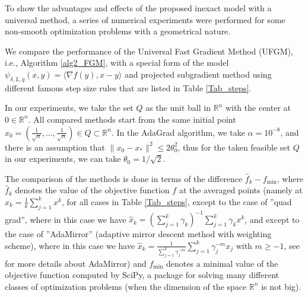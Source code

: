 \documentclass[11pt]{amsart}
\theoremstyle{definition}
\numberwithin{equation}{section}
\begin{document}
To show the advantages and effects of the proposed inexact model with a universal method, a series of numerical experiments were performed for some non-smooth optimization problems with a geometrical nature. 

We compare the performance of the Universal Fast Gradient Method (UFGM), i.e., Algorithm \ref{alg2_FGM}, with a special form of the model $\psi_{\delta, L, q}(x,y) = \langle \nabla f(y), x - y \rangle$ and projected subgradient method using different famous step size rules that are listed in Table \ref{Tab_steps}. 

In our experiments, we take the set $Q$ as the unit ball in $\mathbb{R}^n$ with the center at $0 \in \mathbb{R}^n$. All compared methods start from the same initial point $x_0 = \left(\frac{1}{\sqrt{n}}, \ldots, \frac{1}{\sqrt{n}}\right) \in Q \subset \mathbb{R}^n$. In the AdaGrad algorithm, we take $\alpha = 10^{-8}$, and there is an assumption that $\|x_0 - x_*\|^2 \leq 2 \theta_0^2$, thus for the taken feasible set $Q$ in our experiments, we can take $\theta_0 = 1/\sqrt{2}$.  

The comparison of the methods is done in terms of the difference $\hat{f}_k - f_{\text{min}}$, where $\hat{f}_k$ denotes the value of the objective function $f$ at the averaged points (namely at $\hat{x}_k = \frac{1}{k} \sum_{j = 1}^{k} x^k$, for all cases in Table \ref{Tab_steps}, except to the case of ''quad grad'', where in this case we have $\hat{x}_k = \left(\sum_{j = 1}^{k} \gamma_k\right)^{-1} \sum_{j=1}^{k} \gamma_k x^k $, and except to the case of ''AdaMirror'' (adaptive mirror descent method with weighting scheme), where in this case we have $\hat{x}_k = \frac{1}{\sum_{j= 1}^{k} \gamma_j^{-m}} \sum_{j = 1}^{k} \gamma_j^{-m} x_j $ with $m \geq -1$, see \cite{moh2024asmaa} for more details about AdaMirror) and $f_{\text{min}}$ denotes a minimal value of the objective function computed by SciPy, a package for solving many different classes of optimization problems (when the dimension of the space $\mathbb{R}^n$ is not big).  
\end{document}
